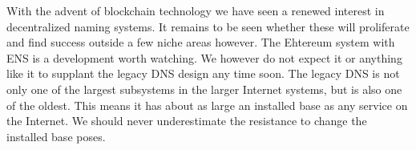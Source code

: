 \documentclass[sigconf]{acmart}
\begin{document}
With the advent of blockchain technology we have seen a renewed interest
in decentralized naming systems.  It remains to be seen whether these
will proliferate and find success outside a few niche areas however.
The Ehtereum system with ENS is a development worth watching.  We
however do not expect it or anything like it to supplant the legacy DNS
design any time soon.  The legacy DNS is not only one of the largest
subsystems in the larger Internet systems, but is also one of the
oldest.  This means it has about as large an installed base as any
service on the Internet.  We should never underestimate the resistance
to change the installed base poses.


\end{document}
